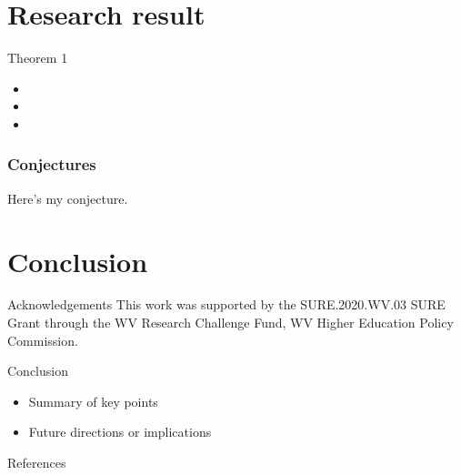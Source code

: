 \documentclass{beamer}
\begin{document}
\section{Research result}
\begin{frame}{Theorem 1}
  \begin{itemize}
    \item 
    \item 
    \item 
  \end{itemize}
\end{frame}

\begin{frame}
    \frametitle{Conjectures}
    Here's my conjecture.
\end{frame}

\section{Conclusion}
\begin{frame}{Acknowledgements}
    This work was supported by the SURE.2020.WV.03 SURE Grant through the WV Research Challenge Fund, WV Higher Education Policy Commission.
\end{frame}
\begin{frame}{Conclusion}
  \begin{itemize}
    \item Summary of key points
    \item Future directions or implications
  \end{itemize}
\end{frame}


\begin{frame}{References}
  
    \printbibliography

\end{frame}
\end{document}
